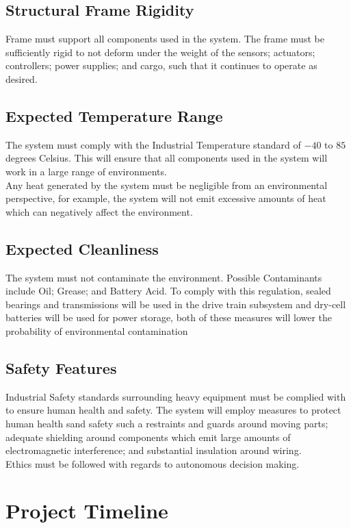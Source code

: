 \documentclass[12pt]{article}
\begin{document}
\subsection{Structural Frame Rigidity}
Frame must support all components used in the system. The frame must be sufficiently rigid to not deform under the weight of the sensors; actuators; controllers; power supplies; and cargo, such that it continues to operate as desired.
\subsection{Expected Temperature Range}
The system must comply with the Industrial Temperature standard of $-40$ to $85$ degrees Celsius. This will ensure that all components used in the system will work in a large range of environments. \\

Any heat generated by the system must be negligible from an environmental perspective, for example, the system will not emit excessive amounts of heat which can negatively affect the environment. 
\subsection{Expected Cleanliness}
The system must not contaminate the environment. Possible Contaminants include Oil; Grease; and Battery Acid. To comply with this regulation, sealed bearings and transmissions will be used in the drive train subsystem and dry-cell batteries will be used for power storage, both of these measures will lower the probability of environmental contamination
\subsection{Safety Features}
Industrial Safety standards surrounding heavy equipment must be complied with to ensure human health and safety. The system will employ measures to protect human health sand safety such a restraints and guards around moving parts; adequate shielding around components which emit large amounts of electromagnetic interference; and substantial insulation around wiring. \\

Ethics must be followed with regards to autonomous decision making. 

\clearpage
\section{Project Timeline}
\end{document}
